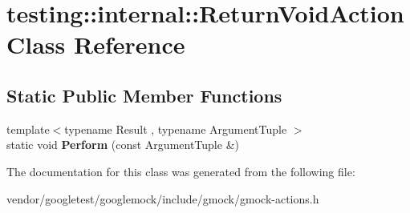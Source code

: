 \hypertarget{classtesting_1_1internal_1_1ReturnVoidAction}{}\section{testing\+:\+:internal\+:\+:Return\+Void\+Action Class Reference}
\label{classtesting_1_1internal_1_1ReturnVoidAction}
\subsection*{Static Public Member Functions}
\begin{DoxyCompactItemize}
\item 
{\footnotesize template$<$typename Result , typename Argument\+Tuple $>$ }\\static void {\bfseries Perform} (const Argument\+Tuple \&)\hypertarget{classtesting_1_1internal_1_1ReturnVoidAction_ab9ea50ff501225b7510a623d0f0a405e}{}\label{classtesting_1_1internal_1_1ReturnVoidAction_ab9ea50ff501225b7510a623d0f0a405e}

\end{DoxyCompactItemize}


The documentation for this class was generated from the following file\+:\begin{DoxyCompactItemize}
\item 
vendor/googletest/googlemock/include/gmock/gmock-\/actions.\+h\end{DoxyCompactItemize}
